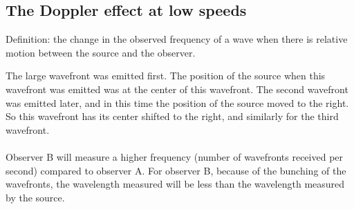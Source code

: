\subsection{The Doppler effect at low speeds}
Definition: the change in the observed frequency of a wave when there is relative motion between the source and the observer.
\begin{center}
\end{center}
The large wavefront was emitted first. The position of the source when
this wavefront was emitted was at the center of this wavefront. The second wavefront was emitted later, and in
this time the position of the source moved to the right. So this wavefront has its center shifted to the right, and
similarly for the third wavefront.\\\\
Observer B will measure a higher frequency (number of wavefronts received per second) compared to observer A. For observer B, because of the bunching of the wavefronts, the wavelength measured will be less than the wavelength measured by the source. 
